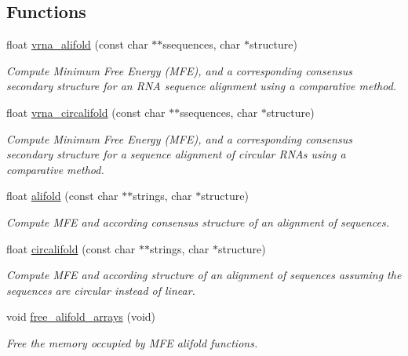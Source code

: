 \subsection*{Functions}
\begin{DoxyCompactItemize}
\item 
float \hyperlink{group__consensus__mfe__fold_ga02098d0c8790f9a37fbef6ad0cfc705c}{vrna\-\_\-alifold} (const char $\ast$$\ast$ssequences, char $\ast$structure)
\begin{DoxyCompactList}\small\item\em Compute Minimum Free Energy (M\-F\-E), and a corresponding consensus secondary structure for an R\-N\-A sequence alignment using a comparative method. \end{DoxyCompactList}\item 
float \hyperlink{group__consensus__mfe__fold_ga01ce2cff93ea44c4f4254760ca2bd16c}{vrna\-\_\-circalifold} (const char $\ast$$\ast$ssequences, char $\ast$structure)
\begin{DoxyCompactList}\small\item\em Compute Minimum Free Energy (M\-F\-E), and a corresponding consensus secondary structure for a sequence alignment of circular R\-N\-As using a comparative method. \end{DoxyCompactList}\item 
float \hyperlink{group__consensus__mfe__fold_ga4cf00f0659e5f0480335d69e797f05b1}{alifold} (const char $\ast$$\ast$strings, char $\ast$structure)
\begin{DoxyCompactList}\small\item\em Compute M\-F\-E and according consensus structure of an alignment of sequences. \end{DoxyCompactList}\item 
float \hyperlink{group__consensus__mfe__fold_gadbd3b0b1c144cbfb4efe704b2b260f96}{circalifold} (const char $\ast$$\ast$strings, char $\ast$structure)
\begin{DoxyCompactList}\small\item\em Compute M\-F\-E and according structure of an alignment of sequences assuming the sequences are circular instead of linear. \end{DoxyCompactList}\item 
void \hyperlink{group__consensus__mfe__fold_ga72095e4554b5d577250ea14c42acc49e}{free\-\_\-alifold\-\_\-arrays} (void)
\begin{DoxyCompactList}\small\item\em Free the memory occupied by M\-F\-E alifold functions. \end{DoxyCompactList}\end{DoxyCompactItemize}


